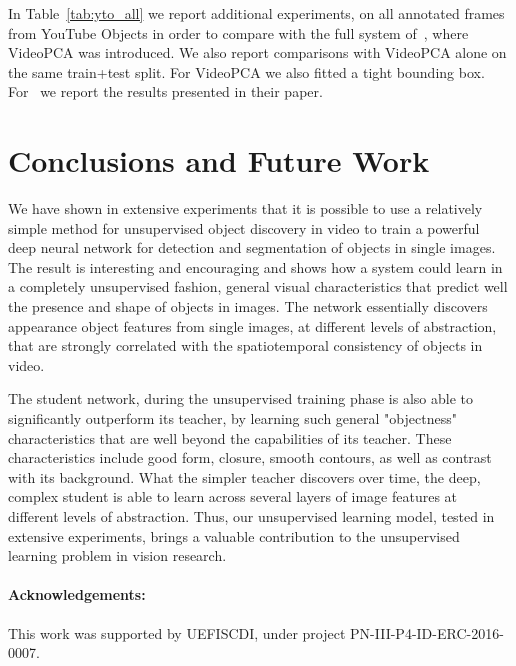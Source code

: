 \documentclass[10pt,twocolumn,letterpaper]{article}
\begin{document}
In Table~\ref{tab:yto_all} we report additional experiments, on all annotated frames from YouTube Objects in order to compare with the full system of~\cite{stretcu2015multiple}, where VideoPCA was introduced. We also report comparisons with VideoPCA alone on the same train+test split. For VideoPCA we also fitted a tight bounding box. For~\cite{stretcu2015multiple} we report the results presented in their paper.

\section{Conclusions and Future Work}\label{sec:conclusions}

We have shown in extensive experiments that it is possible to use a relatively simple method
for unsupervised object discovery in video to train a powerful deep neural network for detection and segmentation of objects in single images. The result is interesting and encouraging and shows how
a system could learn in a completely unsupervised fashion, general visual characteristics that predict well the presence and shape of objects in images. The network essentially discovers appearance object features from single images, at different levels of abstraction, that are strongly correlated with the spatiotemporal consistency of objects in video.

The student network, during the unsupervised training phase is also able to significantly outperform its teacher, by learning such general "objectness" characteristics that are well beyond the capabilities of its teacher. These characteristics include good form, closure, smooth contours, as well as contrast with its background. What the simpler teacher discovers over time, the deep, complex student is able to learn across several layers of image features at different levels of abstraction. Thus, our unsupervised learning model, tested in extensive experiments, brings a valuable contribution to the unsupervised learning problem in vision research.

\paragraph{Acknowledgements:} This work was supported by UEFISCDI, under project PN-III-P4-ID-ERC-2016-0007.

{\small


}
\end{document}

